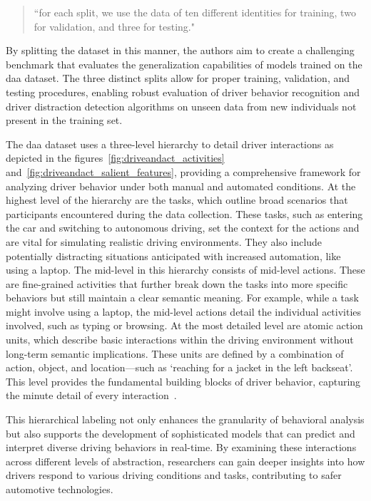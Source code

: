 \begin{quote}``for each split, we use the data of ten different identities for training, two for validation, and three for testing." ~\citep{martin2019drive_and_act_2019_iccv}   
\end{quote}

By splitting the dataset in this manner, the authors aim to create a challenging benchmark that evaluates the generalization capabilities of models trained on the \gls{daa} dataset. The three distinct splits allow for proper training, validation, and testing procedures, enabling robust evaluation of driver behavior recognition and driver distraction detection algorithms on unseen data from new individuals not present in the training set.

The \gls{daa} dataset uses a three-level hierarchy to detail driver interactions as depicted in the figures~\ref{fig:driveandact_activities} and~\ref{fig:driveandact_salient_features}, providing a comprehensive framework for analyzing driver behavior under both manual and automated conditions. At the highest level of the hierarchy are the tasks, which outline broad scenarios that participants encountered during the data collection. These tasks, such as entering the car and switching to autonomous driving, set the context for the actions and are vital for simulating realistic driving environments. They also include potentially distracting situations anticipated with increased automation, like using a laptop. The mid-level in this hierarchy consists of mid-level actions. These are fine-grained activities that further break down the tasks into more specific behaviors but still maintain a clear semantic meaning. For example, while a task might involve using a laptop, the mid-level actions detail the individual activities involved, such as typing or browsing. At the most detailed level are atomic action units, which describe basic interactions within the driving environment without long-term semantic implications. These units are defined by a combination of action, object, and location—such as `reaching for a jacket in the left backseat'. This level provides the fundamental building blocks of driver behavior, capturing the minute detail of every interaction~\citep{martin2019drive_and_act_2019_iccv}.

This hierarchical labeling not only enhances the granularity of behavioral analysis but also supports the development of sophisticated models that can predict and interpret diverse driving behaviors in real-time. By examining these interactions across different levels of abstraction, researchers can gain deeper insights into how drivers respond to various driving conditions and tasks, contributing to safer automotive technologies.

